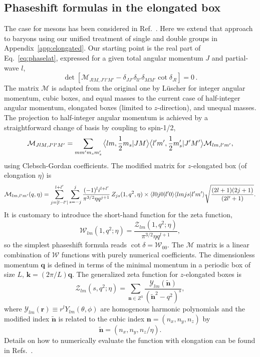 \documentclass[aps,prd,reprint,showpacs,floatfix,longbibliography,,superscriptaddress]{revtex4-1}
\def\mw{\mathcal{W}}
\def\beq{\begin{equation}}
\def\eeq{\end{equation}}
\begin{document}
\begin{widetext}
\subsection{Phaseshift formulas in the elongated box}
\label{sec:phase_elongated}

The case for mesons has been considered in Ref.~\cite{Feng:2004ua}. 
Here we extend that approach to baryons using our unified treatment of single and double groups in Appendix~\ref{app:elongated}.
Our starting point is the real part of Eq.~\ref{eq:phaselat}, 
expressed for a given total angular momentum $J$ and partial-wave $l$,
\beq
\det  [ \mathcal{M}_{Jl M,J'l' M' }- \delta_{JJ'}  \delta_{ll'}  \delta_{MM'} \cot \delta_{Jl} ] 
=0\,.
\label{eq:phaselat2}
\eeq
The matrix $\mathcal{M}$ is adapted from 
the original one by L\"{u}scher for integer angular momentum, cubic boxes, 
and equal masses to the current case of 
half-integer angular momentum, elongated boxes (limited to $z$-direction), and unequal masses. The projection to half-integer angular momentum is achieved by a straightforward change of basis by coupling to spin-1/2,
\beq
 \mathcal{M}_{Jl M,J'l' M' } = 
\sum_{m m'm_s m_s'} \big\langle l m, {1\over 2} m_s | JM \big\rangle \big\langle l' m', {1\over 2} m'_s | J' M' \big \rangle 
 \mathcal{M}_{l m,l' m' } ,
 \label{eq:mproj}
\eeq
using Clebsch-Gordan coefficients. The modified matrix for $z$-elongated 
box (of elongation $\eta$) is 
\beq
\mathcal{M}_{l m,l' m' } (q,{\eta})= \sum_{j=[l-l'|}^{l+l'} \sum_{s=-j}^{j} 
{  (-1)^l  i^{l+l'} \over \pi^{3/2} \eta q^{j+1} } \,  Z_{js}(1,q^2,\eta)
 \times \langle l0j0|l'0\rangle  \langle lmjs|l'm'\rangle  \sqrt{{(2l+1)(2j+1)\over (2l'+1)}}.
\label{eq:mmat}
\eeq
It is customary to introduce the short-hand function for the zeta function,
\beq
\mw_{lm}(1,q^2;\eta) = \frac{\mathcal{Z}_{lm}(1,q^2;\eta)}{\pi^{3/2}\eta q^{l+1}},
\label{eq:wfun}
\eeq
so the simplest phaseshift formula reads $\cot\delta=\mw_{00}$. 
The $\mathcal{M}$ matrix is a linear combination of $\mw$ functions with purely numerical coefficients.
The dimensionless momentum $\bm q$ is defined in terms of the minimal momentum in a periodic box
of size $L$, $\bm k=(2\pi/L)\bm q$.
The generalized zeta function for $z$-elongated boxes is
\beq
\mathcal{Z}_{lm} (s,q^2;\eta) = \sum_{\bm n\in Z^3} \frac{\mathcal{Y}_{lm}(\widetilde{\bm n})}{(\widetilde{\bm n}^2-q^2)^s},
\label{eq:zfun}
\eeq
where $\mathcal{Y}_{lm}(\bm r)\equiv r^l Y_{lm}(\theta,\phi)$ are homogenous harmonic polynomials 
and the modified index 
$\widetilde{\bm n}$ is related to the cubic index $\bm n=(n_x,n_y,n_z)$ by
\beq
\widetilde{\bm n} = (n_x,n_y,n_z/\eta). 
\label{eq:psum}
\eeq
Details on how to numerically evaluate the function with elongation can be found in Refs.~\cite{Feng:2004ua,Guo:2016zos}.


\end{widetext}
\end{document}
